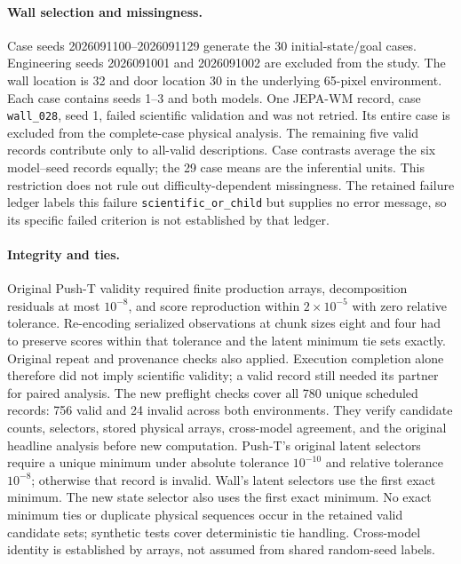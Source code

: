 \paragraph{Wall selection and missingness.}
Case seeds 2026091100--2026091129 generate the 30 initial-state/goal cases.
Engineering seeds 2026091001 and 2026091002 are excluded from the study.
The wall location is 32 and door location 30 in the underlying 65-pixel
environment. Each case contains seeds 1--3 and both models. One JEPA-WM
record, case \texttt{wall\_028}, seed 1, failed scientific validation and was
not retried. Its entire case is excluded from the complete-case physical
analysis. The remaining five valid records contribute only to all-valid
descriptions. Case contrasts average the six model--seed records equally;
the 29 case means are the inferential units. This restriction does not rule
out difficulty-dependent missingness.
The retained failure ledger labels this failure \texttt{scientific\_or\_child}
but supplies no error message, so its specific failed criterion is not
established by that ledger.

\paragraph{Integrity and ties.}
Original Push-T validity required finite production arrays, decomposition
residuals at most $10^{-8}$, and score reproduction within $2\times10^{-5}$
with zero relative tolerance. Re-encoding serialized observations at chunk
sizes eight and four had to preserve scores within that tolerance and the
latent minimum tie sets exactly. Original repeat and provenance checks also
applied. Execution completion alone therefore did not imply scientific
validity; a valid record still needed its partner for paired analysis.
The new preflight checks cover all 780 unique scheduled records: 756 valid
and 24 invalid across both environments. They verify candidate counts,
selectors, stored physical arrays, cross-model agreement, and the original
headline analysis before new computation. Push-T's original latent selectors
require a unique minimum under absolute tolerance $10^{-10}$ and relative
tolerance $10^{-8}$; otherwise that record is invalid. Wall's latent selectors
use the first exact minimum. The new state selector also uses the first exact
minimum. No exact minimum ties or duplicate physical sequences occur in the
retained valid candidate sets; synthetic tests cover deterministic tie
handling. Cross-model identity is established by arrays, not assumed from
shared random-seed labels.

